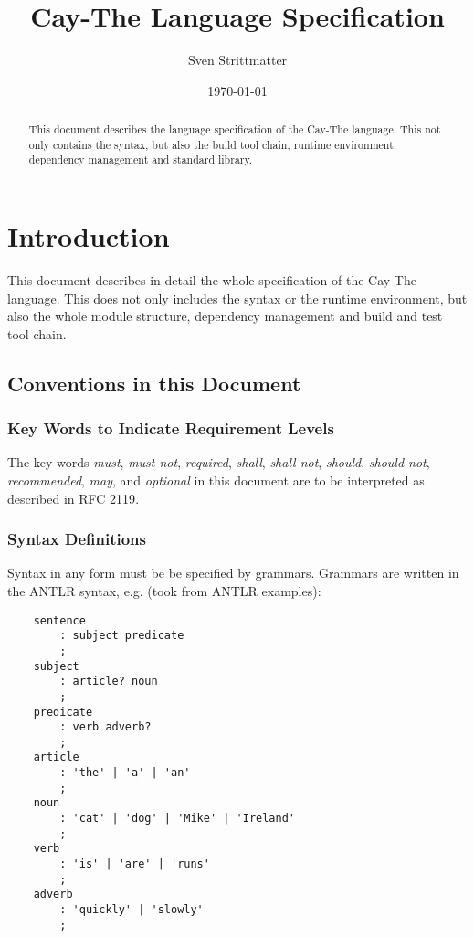 \documentclass[11pt,a4paper]{report}
\title{Cay-The Language Specification}
\author{Sven Strittmatter}
\date{\today}
\begin{document}

\maketitle
\thispagestyle{empty}

\begin{abstract}
    This document describes the language specification of the Cay-The language. This not only contains the syntax, but also the build tool chain, runtime environment, dependency management and standard library.
\end{abstract}

\tableofcontents

\chapter{Introduction}

This document describes in detail the whole specification of the Cay-The language. This does not only includes the syntax or the runtime environment, but also the whole module structure, dependency management and build and test tool chain.

\section{Conventions in this Document}

\subsection{Key Words to Indicate Requirement Levels}

The key words \textit{must}, \textit{must not}, \textit{required}, \textit{shall}, \textit{shall not}, \textit{should}, \textit{should not}, \textit{recommended}, \textit{may}, and \textit{optional} in this document are to be interpreted as described in RFC 2119\cite{rfc2119}.

\subsection{Syntax Definitions}

Syntax in any form must be be specified by grammars. Grammars are written in the ANTLR syntax\cite{antlr-docu}, e.g. (took from ANTLR examples\cite{antlr-grammars}):

\begin{lstlisting}
    sentence    
        : subject predicate
        ;
    subject
        : article? noun 
        ;
    predicate
        : verb adverb?
        ;
    article
        : 'the' | 'a' | 'an' 
        ;
    noun
        : 'cat' | 'dog' | 'Mike' | 'Ireland'
        ;
    verb
        : 'is' | 'are' | 'runs' 
        ;
    adverb
        : 'quickly' | 'slowly'
        ;
\end{lstlisting}
\end{document}
